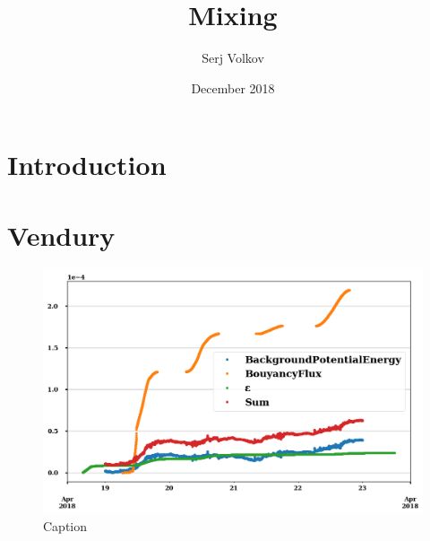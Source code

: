 \documentclass{article}
\title{Mixing}
\author{Serj Volkov}
\date{December 2018}
\begin{document}
\maketitle

\section{Introduction}

\section{Vendury}

\begin{figure}
    \centering
    \includegraphics[width=\textwidth]{vend2018.png}
    \caption{Caption}
    \label{fig:vend2018}
\end{figure}
\end{document}
